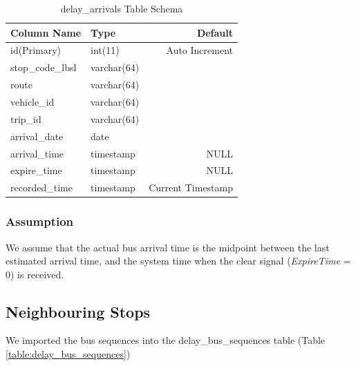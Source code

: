\begin{table}
\centering
\begin{tabular}{@{}llr@{}} \toprule
Column Name & Type & Default \\ \midrule
id(Primary) & int(11) & Auto Increment \\
stop\_code\_lbsl & varchar(64) &  \\
route & varchar(64) &  \\
vehicle\_id & varchar(64) & \\
trip\_id & varchar(64) & \\
arrival\_date & date &  \\
arrival\_time & timestamp & NULL \\
expire\_time & timestamp & NULL \\
recorded\_time & timestamp & Current Timestamp \\ \bottomrule
\end{tabular}
\caption{delay\_arrivals Table Schema}
\label{table:delay_arrivals_schema}
\end{table}

\subsubsection{Assumption}
We assume that the actual bus arrival time is the midpoint between the last estimated arrival time, and the system time when the clear signal (\textit{ExpireTime} = 0) is received.

\subsection{Neighbouring Stops}
\label{sec:bus_stop_locations_routes}
We imported the bus sequences into the delay\_bus\_sequences table (Table \ref{table:delay_bus_sequences})

